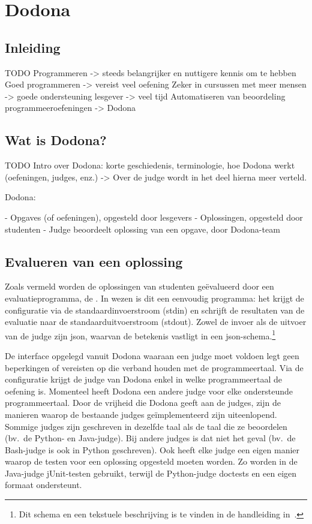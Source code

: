 \chapter{Dodona}\label{ch:dodona}

\section{Inleiding}\label{sec:inleiding}

TODO
Programmeren -> steeds belangrijker en nuttigere kennis om te hebben
Goed programmeren -> vereist veel oefening
Zeker in cursussen met meer mensen -> goede ondersteuning lesgever -> veel tijd
Automatiseren van beoordeling programmeeroefeningen -> Dodona

\section{Wat is Dodona?}\label{sec:wat-is-dodona}

TODO
Intro over Dodona: korte geschiedenis, terminologie, hoe Dodona werkt (oefeningen, judges, enz.)
-> Over de judge wordt in het deel hierna meer verteld.

Dodona:

- Opgaves (of oefeningen), opgesteld door lesgevers
- Oplossingen, opgesteld door studenten
- Judge beoordeelt oplossing van een opgave, door Dodona-team

\section{Evalueren van een oplossing}\label{sec:evalueren-van-een-oplossing}

Zoals vermeld worden de oplossingen van studenten geëvalueerd door een evaluatieprogramma, de .
In wezen is dit een eenvoudig programma: het krijgt de configuratie via de standaardinvoerstroom (stdin) en schrijft de resultaten van de evaluatie naar de standaarduitvoerstroom (stdout).
Zowel de invoer als de uitvoer van de judge zijn json, waarvan de betekenis vastligt in een json-schema.\footnote{Dit schema en een tekstuele beschrijving is te vinden in de handleiding in~\autocite{dodona2020}.}

De interface opgelegd vanuit Dodona waaraan een judge moet voldoen legt geen beperkingen of vereisten op die verband houden met de programmeertaal.
Via de configuratie krijgt de judge van Dodona enkel in welke programmeertaal de oefening is.
Momenteel heeft Dodona een andere judge voor elke ondersteunde programmeertaal.
Door de vrijheid die Dodona geeft aan de judges, zijn de manieren waarop de bestaande judges geïmplementeerd zijn uiteenlopend.
Sommige judges zijn geschreven in dezelfde taal als de taal die ze beoordelen (bv.\ de Python- en Java-judge).
Bij andere judges is dat niet het geval (bv.\ de Bash-judge is ook in Python geschreven).
Ook heeft elke judge een eigen manier waarop de testen voor een oplossing opgesteld moeten worden.
Zo worden in de Java-judge jUnit-testen gebruikt, terwijl de Python-judge doctests en een eigen formaat ondersteunt.

